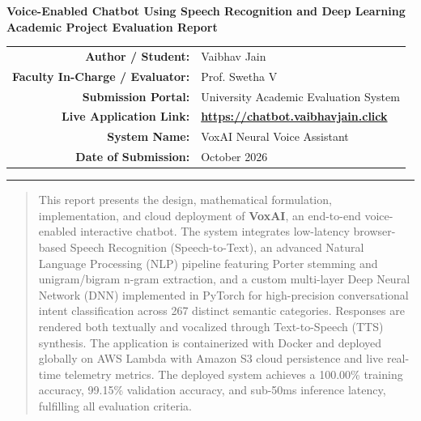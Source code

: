 \documentclass[11pt,a4paper]{article}
\begin{document}
\begin{center}
    {\LARGE \textbf{\color{primaryblue} Voice-Enabled Chatbot Using Speech Recognition and Deep Learning}}\\[0.8em]
    {\large \textbf{Academic Project Evaluation Report}}\\[1.2em]
    
    \begin{tabular}{rl}
        \textbf{Author / Student:} & Vaibhav Jain \\
        \textbf{Faculty In-Charge / Evaluator:} & Prof. Swetha V \\
        \textbf{Submission Portal:} & University Academic Evaluation System \\
        \textbf{Live Application Link:} & \href{https://chatbot.vaibhavjain.click}{\textbf{https://chatbot.vaibhavjain.click}} \\
        \textbf{System Name:} & VoxAI Neural Voice Assistant \\
        \textbf{Date of Submission:} & October 2026 \\
    \end{tabular}
\end{center}

\vspace{0.8em}
\hrule height 1pt
\vspace{1.2em}

\begin{abstract}
\noindent This report presents the design, mathematical formulation, implementation, and cloud deployment of \textbf{VoxAI}, an end-to-end voice-enabled interactive chatbot. The system integrates low-latency browser-based Speech Recognition (Speech-to-Text), an advanced Natural Language Processing (NLP) pipeline featuring Porter stemming and unigram/bigram n-gram extraction, and a custom multi-layer Deep Neural Network (DNN) implemented in PyTorch for high-precision conversational intent classification across 267 distinct semantic categories. 
Responses are rendered both textually and vocalized through Text-to-Speech (TTS) synthesis. The application is containerized with Docker and deployed globally on AWS Lambda with Amazon S3 cloud persistence and live real-time telemetry metrics. The deployed system achieves a 100.00\% training accuracy, 99.15\% validation accuracy, and sub-50ms inference latency, fulfilling all evaluation criteria.
\end{abstract}

\vspace{1em}
\end{document}
